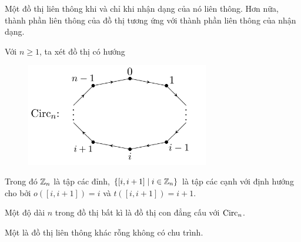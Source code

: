 \begin{remark}
    Một đồ thị liên thông khi và chỉ khi nhận dạng của nó liên thông. Hơn nữa, thành phần liên thông của đồ thị tương ứng với thành phần liên thông của nhận dạng.
\end{remark}

\begin{define}
    Với $n \geq 1$, ta xét đồ thị có hướng
    \begin{figure}[H]
        \includegraphics[width=8cm]{assets/circle-graph.png}
        \centering
    \end{figure}
    Trong đó $\mathbb Z_n$ là tập các đỉnh, $\{ [i,i+1] \mid i \in \mathbb Z_n \}$ là tập các cạnh với định hướng cho bởi $o([i,i+1]) = i$ và $t([i,i+1]) = i + 1$.
\end{define}

\begin{define}
    Một  độ dài $n$ trong đồ thị bất kì là đồ thị con đẳng cấu với $\operatorname{Circ}_n$.
\end{define}

\begin{define}
    Một  là đồ thị liên thông khác rỗng không có chu trình.
\end{define}

